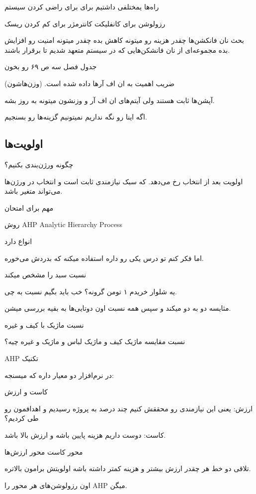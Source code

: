 
راه‌ها یمختلفی داشتیم برای برای راضی کردن سیستم

رزولوشن برای کانفلیکت
کانترمژر برای کم کردن ریسک

بحث نان فانکشن‌ها
چقدر هزینه رو میتونه کاهش بده
چقدر میتونه امنیت رو افزایش بده مجموعه‌ای از نان فانشکن‌هایی که در سیستم متعهد
شدیم تا برقرار باشند.


جدول فصل سه ص ۶۹ رو بخون

ضریب اهمیت به ان اف آر‌ها داده شده است. (وزن‌هاشون)

آپشن‌ها ثابت هستند
ولی آیتم‌های ان اف آر و وزنشون میتونه به روز بشه.

اگه اینا رو نگه نداریم نمیتونیم گزینه‌ها رو بسنجیم.


\subsection{اولویت‌ها}

چگونه ورژن‌بندی بکنیم؟

اولویت بعد از انتخاب رخ می‌دهد.
که سبک نیازمندی ثابت است و انتخاب در ورژن‌ها می‌تواند متغیر باشد.

مهم برای امتحان

روش AHP Analytic Hierarchy Process

انواع دارد

اما فکر کنم تو درس یکی رو داره استفاده میکنه که بدردش می‌خوره.


نسبت سبد را مشخص میکند

یه شلوار خریدم ۱ تومن گرونه؟ خب باید بگیم نسبت به چی.


مثایسه دو به دو میکند و سپس همه نسبت اون دوتایی‌ها به بقیه بررسی میشن.


نسبت ماژیک با کیف و غیره

نسبت مقایسه ماژیک کیف و ماژیک لباس و ماژیک و غیره چیه؟

AHP تکنیک

در نرم‌افزار دو معیار داره که میسنجه:

کاست و ارزش

ارزش: یعنی این نیازمندی رو محققش کنیم چند درصد به پروژه رسیدیم و اهدافمون رو طی
کردیم؟

کاست: دوست داریم هزینه پایین باشه و ارزش بالا باشد.

محور کاست 
محور ارزش‌ها

تلاقی دو خط هر چقدر ارزش بیشتر و هزینه کمتر داشته باشه اولویتش برامون بالاتره.

اون رزولوشن‌های هر محور را AHP میگن.

